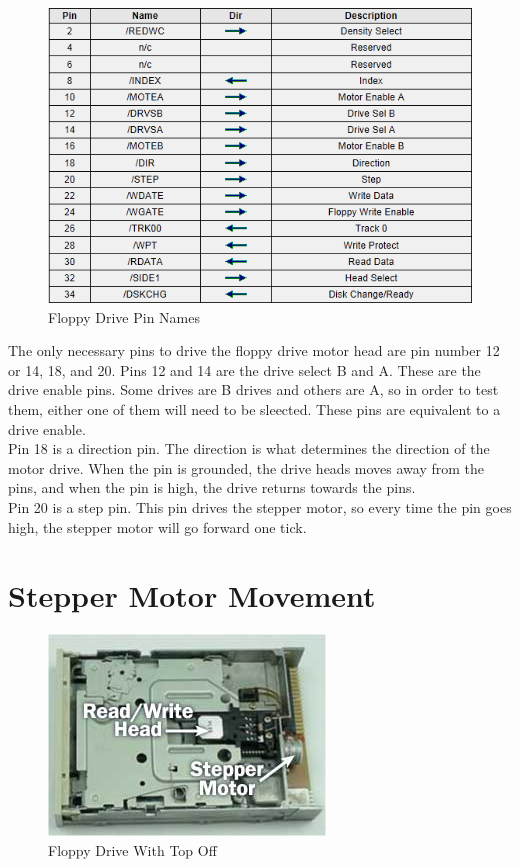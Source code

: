 \documentclass[11pt, a4paper]{report}
\begin{document}
\begin{figure}[H]
\hspace*{-2cm}    
    \centering
    \includegraphics[width=.75\textwidth]{pinNames.png}
    \caption{Floppy Drive Pin Names}
    \label{fig:pinNames}
\end{figure}

The only necessary pins to drive the floppy drive motor head are pin number 12 or 14, 18, and 20. Pins 12 and 14 are the drive select B and A. These are the drive enable pins. Some drives are B drives and others are A, so in order to test them, either one of them will need to be sleected. These pins are equivalent to a drive enable.\\

Pin 18 is a direction pin. The direction is what determines the direction of the motor drive. When the pin is grounded, the drive heads moves away from the pins, and when the pin is high, the drive returns towards the pins. \\

Pin 20 is a step pin. This pin drives the stepper motor, so every time the pin goes high, the stepper motor will go forward one tick.\\

\section{Stepper Motor Movement}


\begin{figure}[H]
\hspace*{-2cm}    
    \centering
    \includegraphics[width=.3\textwidth]{floppydrive_coveroff.jpg}
    \caption{Floppy Drive With Top Off}
    \label{fig:coveroff}
\end{figure}
\end{document}
